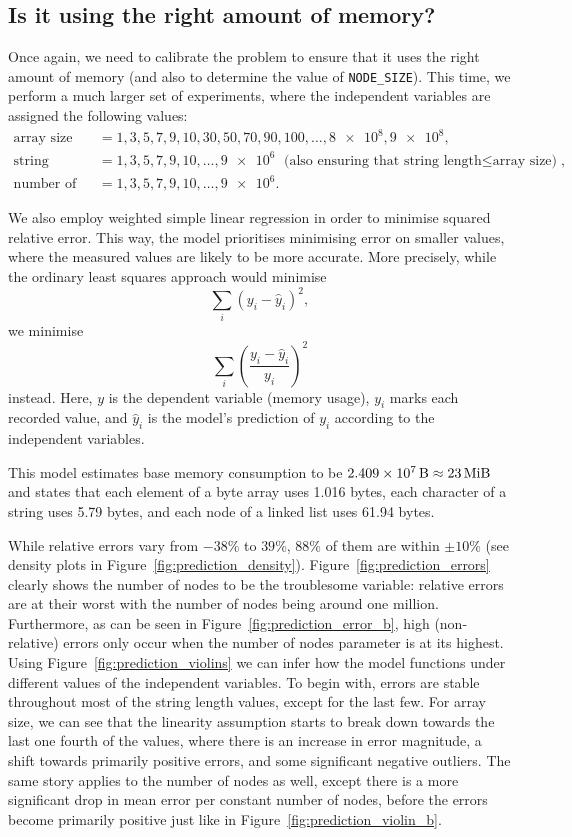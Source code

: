 \documentclass{article}
\begin{document}
\subsection{Is it using the right amount of memory?}

Once again, we need to calibrate the problem to ensure that it uses the right
amount of memory (and also to determine the value of \texttt{NODE\_SIZE}). This
time, we perform a much larger set of experiments, where the independent
variables are assigned the following values:
\begin{align*}
  \text{array size} &= 1, 3, 5, 7, 9, 10, 30, 50, 70, 90, 100, \dots, \num{8e8}, \num{9e8}, \\
  \text{string length} &= 1, 3, 5, 7, 9, 10, \dots, \num{9e6} \text{ (also ensuring that $\text{string length} \le \text{array size}$)}, \\
  \text{number of nodes} &= 1, 3, 5, 7, 9, 10, \dots, \num{9e6}.
\end{align*}

We also employ weighted simple linear regression in order to minimise squared
relative error. This way, the model prioritises minimising error on smaller
values, where the measured values are likely to be more accurate. More
precisely, while the ordinary least squares approach would minimise
\[
  \sum_i (y_i - \hat{y}_i)^2,
\]
we minimise
\[
  \sum_i \left( \frac{y_i - \hat{y}_i}{y_i} \right)^2
\]
instead. Here, $y$ is the dependent variable (memory usage), $y_i$ marks each
recorded value, and $\hat{y}_i$ is the model's prediction of $y_i$ according to
the independent variables.

This model estimates base memory consumption to be $\SI{2.409e7}{\byte} \approx
\SI{23}{\mebi\byte}$ and states that each element of a byte array uses 1.016
bytes, each character of a string uses 5.79 bytes, and each node of a linked
list uses 61.94 bytes.

While relative errors vary from $-38\%$ to $39\%$, $88\%$ of them are within
$\pm10\%$ (see density plots in Figure~\ref{fig:prediction_density}).
Figure~\ref{fig:prediction_errors} clearly shows the number of nodes to be the
troublesome variable: relative errors are at their worst with the number of
nodes being around one million. Furthermore, as can be seen in
Figure~\ref{fig:prediction_error_b}, high (non-relative) errors only occur when
the number of nodes parameter is at its highest. Using
Figure~\ref{fig:prediction_violins} we can infer how the model functions under
different values of the independent variables. To begin with, errors are stable
throughout most of the string length values, except for the last few. For array
size, we can see that the linearity assumption starts to break down towards the
last one fourth of the values, where there is an increase in error magnitude, a
shift towards primarily positive errors, and some significant negative outliers.
The same story applies to the number of nodes as well, except there is a more
significant drop in mean error per constant number of nodes, before the errors
become primarily positive just like in Figure~\ref{fig:prediction_violin_b}.
\end{document}
